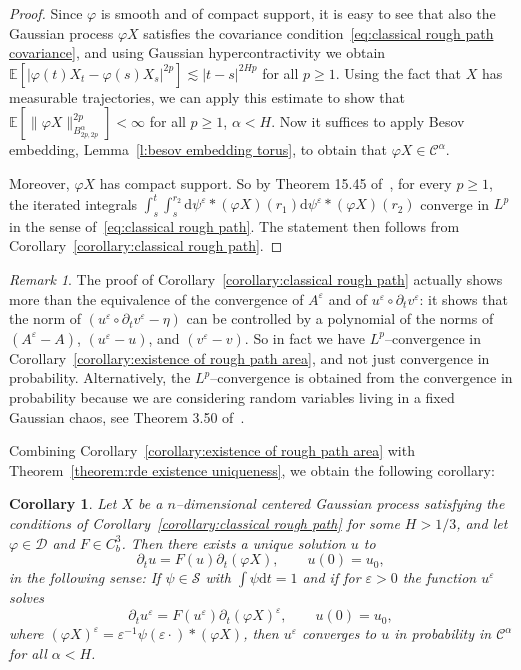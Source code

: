 \documentclass[11pt,a4paper]{article}
\newcommand{\mathd}{\mathrm{d}}
\newtheorem{corollary}[theorem]{Corollary}
\theoremstyle{remark}
\newtheorem{remark}[theorem]{Remark}
\newcommand{\E}{\mathbb{E}}
\newcommand{\CC}{\ensuremath{\mathscr{C}}}
\newcommand{\CD}{\ensuremath{\mathscr{D}}}
\newcommand{\CS}{\ensuremath{\mathscr{S}}}
\begin{document}
\begin{proof}
  Since $\varphi$ is smooth and of compact support, it is easy to see that
  also the Gaussian process $\varphi X$ satisfies the covariance
  condition~{\eqref{eq:classical rough path covariance}}, and using Gaussian hypercontractivity we obtain $\mathbb{E} [ | \varphi(t)X_{t} -\varphi(s)X_{s} |^{2p} ] \lesssim | t-s |^{2Hp}$ for all $p \geqslant 1$. Using the fact that $X$ has measurable trajectories, we can apply this estimate to show that $\E[\| \varphi X\|_{B^\alpha_{2p,2p}}^{2p}] < \infty$ for all $p \geqslant 1$, $\alpha < H$. Now it suffices to apply Besov embedding, Lemma~\ref{l:besov embedding torus}, to obtain that $\varphi X \in \CC^\alpha$.

  Moreover, $\varphi X$ has compact support. So by Theorem 15.45 of~{\cite{Friz2010}}, for every $p \geqslant 1$, the
  iterated integrals $\int_{s}^{t} \int_{s}^{r_{2}} \mathd \psi^{\varepsilon} \ast ( \varphi X ) ( r_{1} ) \mathd \psi^{\varepsilon} \ast ( \varphi X ) ( r_{2} )$ converge in $L^{p}$ in the sense of~{\eqref{eq:classical rough path}}. The statement then follows from Corollary~\ref{corollary:classical rough path}.
\end{proof}

\begin{remark}
  The proof of Corollary~\ref{corollary:classical rough path} actually shows
  more than the equivalence of the convergence of $A^{\varepsilon}$ and of
  $u^{\varepsilon} \circ \partial_{t} v^{\varepsilon}$: it shows that the norm
  of $( u^{\varepsilon} \circ \partial_{t} v^{\varepsilon} - \eta )$ can be
  controlled by a polynomial of the norms of $( A^{\varepsilon} -A )$, $(u^{\varepsilon} -u )$, and $(v^{\varepsilon} -v)$. So in fact we
  have $L^{p}$--convergence in Corollary~\ref{corollary:existence of rough path area}, and not just convergence in probability. Alternatively, the $L^p$--convergence is obtained from the convergence in probability because we are considering random variables living in a fixed Gaussian chaos, see Theorem 3.50 of~\cite{Janson1997}.
\end{remark}

Combining Corollary~\ref{corollary:existence of rough path area} with Theorem~\ref{theorem:rde existence uniqueness}, we obtain the following corollary:

\begin{corollary}
  Let $X$ be a $n$--dimensional centered Gaussian process satisfying the conditions of Corollary~\ref{corollary:classical rough path} for some $H > 1/3$, and let $\varphi \in \CD$ and $F \in C^3_b$. Then there exists a unique solution $u$ to
  \[
     \partial_t u = F(u) \partial_t (\varphi X), \qquad u(0) = u_0,
  \]
  in the following sense: If $\psi \in \CS$ with $\int \psi \mathd t=1$ and if for $\varepsilon > 0$ the function $u^\varepsilon$ solves
  \[
     \partial_t u^\varepsilon = F(u^\varepsilon) \partial_t (\varphi X)^\varepsilon, \qquad u(0) = u_0,
  \]
  where $(\varphi X)^\varepsilon = \varepsilon^{-1} \psi(\varepsilon \cdot) \ast (\varphi X)$, then $u^\varepsilon$ converges to $u$ in probability in $\CC^\alpha$ for all $\alpha < H$.
\end{corollary}
\end{document}

